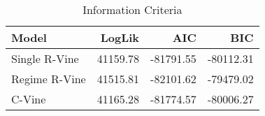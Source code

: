 \begin{table}

\caption{Information Criteria}
\centering
\begin{tabular}[t]{lrrr}
\toprule
Model & LogLik & AIC & BIC\\
\midrule
Single R-Vine & 41159.78 & -81791.55 & -80112.31\\
Regime R-Vine & 41515.81 & -82101.62 & -79479.02\\
C-Vine & 41165.28 & -81774.57 & -80006.27\\
\bottomrule
\end{tabular}
\end{table}
